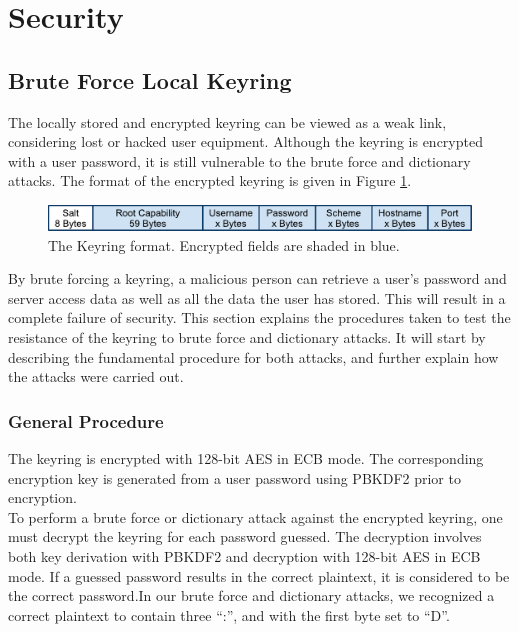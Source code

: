 \documentclass[pdftex,english,10pt,b5paper,twoside]{book}
\begin{document}
\section{Security}

\subsection{Brute Force Local Keyring}
\label{sec:BFLK}
The locally stored and encrypted keyring can be viewed as a weak link, considering lost or hacked user
equipment. Although the keyring is encrypted with a user password, it is still
vulnerable to the brute force and dictionary attacks. The format of
the encrypted keyring is given in Figure \ref{fig:KeyringFormat}. 

\begin{figure}[h!]
    \centering
    \includegraphics[scale=0.6]{KeyringFormat.pdf}
    \caption{The Keyring format. Encrypted fields are shaded in blue.}
    \label{fig:KeyringFormat}
\end{figure}

\noindent By brute forcing a keyring, a malicious person can retrieve a user's
password and server access data as well as all the data the user has stored.
This will result in a complete failure of security. This section explains the
procedures taken to test the resistance of the keyring to brute force and
dictionary attacks. It will start by describing the fundamental procedure for
both attacks, and further explain how the attacks were carried out.

\subsubsection{General Procedure}
The keyring is encrypted with 128-bit AES in ECB mode. The corresponding
encryption key is generated from a user password using PBKDF2 prior to
encryption.\\

\noindent To perform a brute force or dictionary attack against the encrypted
keyring, one must decrypt the keyring for each password guessed. The decryption
involves both key derivation with PBKDF2 and decryption with 128-bit AES in ECB
mode. If a guessed password results in the correct plaintext, it is
considered to be the correct password.In our brute force and dictionary
attacks, we recognized a correct plaintext to contain three ``:'', and with the
first byte set to ``D''.
\end{document}
